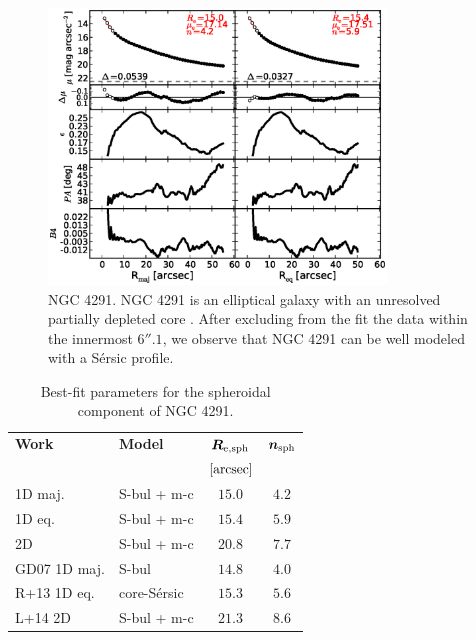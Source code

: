 \documentclass[preprint2]{emulateapj}
\newcommand{\fitfigurewidth}{0.8\textwidth}
\begin{document}
  \begin{figure}[h]
  \begin{center}
  \includegraphics[width=\fitfigurewidth]{images/n4291_1Dfit.eps}
  \caption{NGC 4291.
  NGC 4291 is an elliptical galaxy with an unresolved partially depleted core \citep{rusli2013}. %
  After excluding from the fit the data within the innermost $6''.1$, 
  we observe that NGC 4291 can be well modeled with a S\'ersic profile.
  }
  \end{center}
  \end{figure}

  \begin{table}[h]
  \small
  \caption{Best-fit parameters for the spheroidal component of NGC 4291.}
  \begin{center}
  \begin{tabular}{llcc}
  \hline
  {\bf Work} & {\bf Model}   & $\bm R_{\rm e,sph}$    & $\bm n_{\rm sph}$ \\
    &  &  $[\rm arcsec]$ & \\
  \hline
  1D maj. & S-bul + m-c & $15.0$  &  $4.2$ \\
  1D eq.  & S-bul + m-c & $15.4$  &  $5.9$ \\
  2D      & S-bul + m-c & $20.8$  &  $7.7$ \\
  \hline
  GD07 1D maj.         & S-bul         & $14.8$  &  $4.0$ \\
  R+13 1D eq.         & core-S\'ersic & $15.3$  &  $5.6$ \\
  L+14 2D         & S-bul + m-c   & $21.3$  &  $8.6$ \\
  \hline
  \end{tabular}
  \end{center}
  \label{tab:n4291}
  \end{table}
\end{document}
